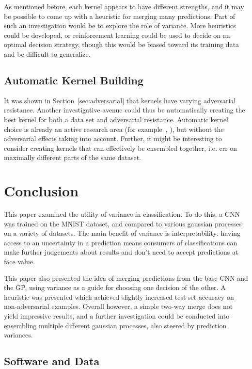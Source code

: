\documentclass{article}
\begin{document}
As mentioned before, each kernel appears to have different strengths, and it may be possible to come up with a heuristic for merging many predictions. Part of such an investigation would be to explore the role of variance. More heuristics could be developed, or reinforcement learning could be used to decide on an optimal decision strategy, though this would be biased toward its training data and be difficult to generalize.

\subsection{Automatic Kernel Building}
It was shown in Section~\ref{sec:adversarial} that kernels have varying adversarial resistance. Another investigative avenue could thus be automatically creating the best kernel for both a data set and adversarial resistance. Automatic kernel choice is already an active research area (for example~\cite{abdessalem2017automatic}, \cite{duvenaud2014automatic}), but without the adversarial effects taking into account. Further, it might be interesting to consider creating kernels that can effectively be ensembled together, i.e. err on maximally different parts of the same dataset.

\section{Conclusion}

This paper examined the utility of variance in classification. To do this, a CNN was trained on the MNIST dataset, and compared to various gaussian processes on a variety of datasets. The main benefit of variance is interpretability: having access to an uncertainty in a prediction means consumers of classifications can make further judgements about results and don't need to accept predictions at face value.

This paper also presented the idea of merging predictions from the base CNN and the GP, using variance as a guide for choosing one decision of the other. A heuristic was presented which achieved slightly increased test set accuracy on non-adversarial examples. Overall however, a simple two-way merge does not yield impressive results, and a further investigation could be conducted into ensembling multiple different gaussian processes, also steered by prediction variances.

\subsection{Software and Data}
\end{document}
